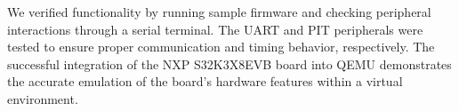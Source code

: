    

We verified functionality by running sample firmware and checking peripheral interactions through a serial terminal. The UART and PIT peripherals were tested to ensure proper communication and timing behavior, respectively. The successful integration of the NXP S32K3X8EVB board into QEMU demonstrates the accurate emulation of the board’s hardware features within a virtual environment.